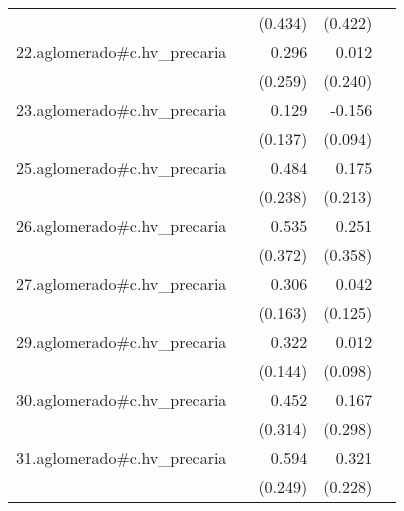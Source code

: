 {\begin{longtable}{l*{4}{D{.}{.}{-1}}}
            &                     &     (0.434)         &     (0.422)         &                     \\
\addlinespace
22.aglomerado#c.hv\_precaria&                     &       0.296         &       0.012         &                     \\
            &                     &     (0.259)         &     (0.240)         &                     \\
\addlinespace
23.aglomerado#c.hv\_precaria&                     &       0.129         &      -0.156         &                     \\
            &                     &     (0.137)         &     (0.094)         &                     \\
\addlinespace
25.aglomerado#c.hv\_precaria&                     &       0.484\sym{*}  &       0.175         &                     \\
            &                     &     (0.238)         &     (0.213)         &                     \\
\addlinespace
26.aglomerado#c.hv\_precaria&                     &       0.535         &       0.251         &                     \\
            &                     &     (0.372)         &     (0.358)         &                     \\
\addlinespace
27.aglomerado#c.hv\_precaria&                     &       0.306         &       0.042         &                     \\
            &                     &     (0.163)         &     (0.125)         &                     \\
\addlinespace
29.aglomerado#c.hv\_precaria&                     &       0.322\sym{*}  &       0.012         &                     \\
            &                     &     (0.144)         &     (0.098)         &                     \\
\addlinespace
30.aglomerado#c.hv\_precaria&                     &       0.452         &       0.167         &                     \\
            &                     &     (0.314)         &     (0.298)         &                     \\
\addlinespace
31.aglomerado#c.hv\_precaria&                     &       0.594\sym{*}  &       0.321         &                     \\
            &                     &     (0.249)         &     (0.228)         &                     \\

\end{longtable}}
